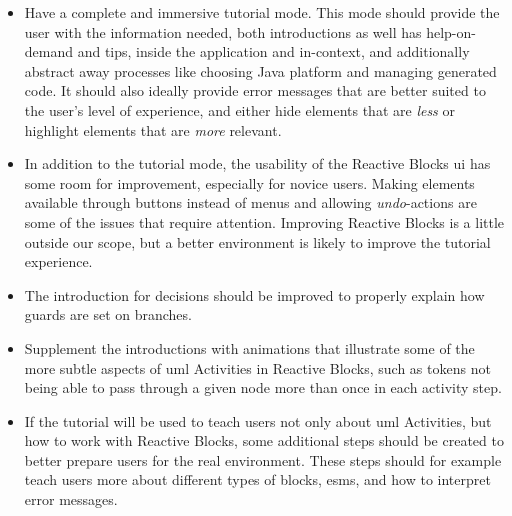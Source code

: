 \begin{itemize}
	\item Have a complete and immersive tutorial mode. This mode should provide the user with the information needed, both introductions as well has help-on-demand and tips, inside the application and in-context, and additionally abstract away processes like choosing Java platform and managing generated code. It should also ideally provide error messages that are better suited to the user's level of experience, and either hide elements that are \emph{less} or highlight elements that are \emph{more} relevant.
	\item In addition to the tutorial mode, the usability of the Reactive Blocks \gls{ui} has some room for improvement, especially for novice users. Making elements available through buttons instead of menus and allowing \emph{undo}-actions are some of the issues that require attention. Improving Reactive Blocks is a little outside our scope, but a better environment is likely to improve the tutorial experience.
	\item The introduction for decisions should be improved to properly explain how guards are set on branches.
	\item Supplement the introductions with animations that illustrate some of the more subtle aspects of \gls{uml} Activities in Reactive Blocks, such as tokens not being able to pass through a given node more than once in each activity step.
	\item If the tutorial will be used to teach users not only about \gls{uml} Activities, but how to work with Reactive Blocks, some additional steps should be created to better prepare users for the real environment. These steps should for example teach users more about different types of blocks, \glspl{esm}, and how to interpret error messages.
\end{itemize}


